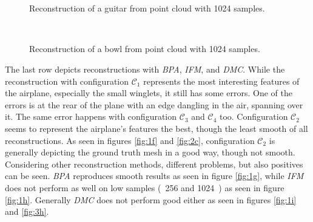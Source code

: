 \begin{figure}[htbp]
  \centering
  \\
  \\
  \caption{Reconstruction of a guitar from point cloud with 1024 samples.} \label{fig:3}
\end{figure}
\begin{figure}[htbp]
  \centering
  \\
  \caption{Reconstruction of a bowl from point cloud with 1024 samples.} \label{fig:4}
\end{figure}

  The last row depicts reconstructions with \emph{BPA}, \emph{IFM}, and \emph{DMC}. While the reconstruction with configuration 
  $\mathcal{C}_1$ represents the most interesting features of the airplane, especially the small winglets, it still has some errors. 
  One of the errors is at the rear of the plane with an edge dangling in the air, spanning over it. The same error happens with configuration
  $\mathcal{C}_3$ and $\mathcal{C}_4$ too. Configuration $\mathcal{C}_2$ seems to represent the airplane's features the best, though the least
  smooth of all reconstructions. As seen in figures \ref{fig:1f} and \ref{fig:2c}, configuration $\mathcal{C}_2$ is generally depicting the ground
    truth mesh in a good way, though not smooth.
  Considering other reconstruction methods, different problems, but also positives can be seen. \emph{BPA} reproduces smooth results as seen 
  in figure \ref{fig:1g}, while \emph{IFM} does not perform as well on low samples (~256 and 1024~) as seen in figure \ref{fig:1h}. Generally 
  \emph{DMC} does not perform good either as seen in figures \ref{fig:1i} and \ref{fig:3h}.

